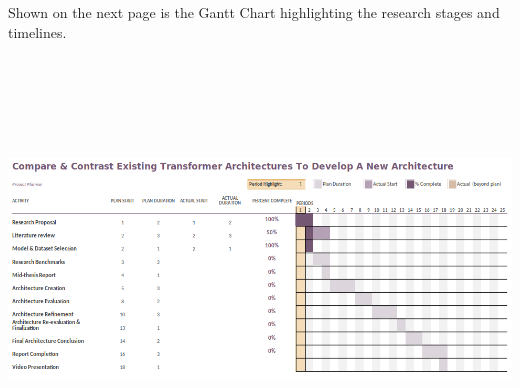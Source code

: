\documentclass[11pt]{article}
\begin{document}
	Shown on the next page is the Gantt Chart highlighting the research stages and timelines.\\
	\includegraphics[width=180mm,height=120mm,angle=90]{g2.png}
	\newpage
	
\end{document}
